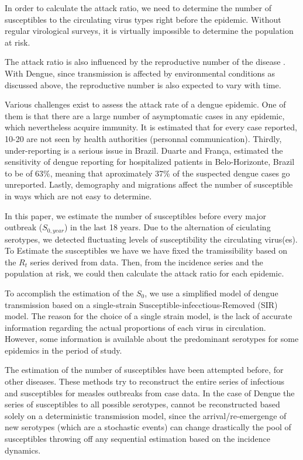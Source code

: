 In order to calculate the attack ratio, we need to determine the number of 
susceptibles to the circulating virus types right before the epidemic. Without 
regular virological surveys, it is virtually impossible to determine the 
population at risk.

The attack ratio is also influenced by the reproductive number of the disease 
\cite{bacaer_final_2009, katriel_attack_2012}. With Dengue, since transmission 
is affected by environmental conditions as discussed above, the reproductive 
number is also expected to vary with time.

Various challenges exist to assess the attack rate of a dengue epidemic. One of 
them is that there are a large number of asymptomatic cases in any epidemic, 
which nevertheless acquire immunity. It is estimated that for 
every case reported, 10-20 are not seen by health authorities (personnal 
communication).
Thirdly, under-reporting is a serious issue in Brazil. 
Duarte and Fran\c{c}a\cite{duarte_data_2006}, estimated 
the sensitivity of dengue reporting for hospitalized patients in 
Belo-Horizonte, Brazil to be of 63\%, 
meaning that aproximately 37\% of the suspected dengue cases go unreported.  
Lastly, demography and migrations affect the number of susceptible in ways which 
are not easy to determine.


In this paper, we estimate the number of susceptibles before every major 
outbreak ($S_{0, year}$) in the last 18 years. Due to the alternation of 
ciculating serotypes, we detected fluctuating levels of susceptibility the 
circulating virus(es). To Estimate the susceptibles we have we have fixed the 
tramissibility based on the $R_t$ series derived from data\cite{nishiura}. Then, 
from the incidence series and the population at risk, we could then calculate 
the attack ratio for each epidemic.

To accomplish the estimation of the $S_0$, we use a simplified model of 
dengue transmission based on a single-strain Susceptible-infecctious-Removed 
(SIR) model. The reason for the choice of a single strain model, is the lack of 
accurate information regarding the actual proportions of each virus in 
circulation. However, some information is available about the predominant 
serotypes for some epidemics in the period 
of study\cite{macedo_virological_2013}. 

The estimation of the  number of susceptibles have been attempted 
before, for other diseases\cite{bjornstad_dynamics_2002, 
wallinga_reconstruction_2003}. These methods try to reconstruct the entire 
series of infectious and susceptibles for measles 
outbreaks from case data. In the case of Dengue the 
series of susceptibles to all possible serotypes, cannot be reconstructed based 
solely on a deterministic transmission model, since the arrival/re-emergenge of 
new serotypes (which are a stochastic events) can change drastically the pool 
of susceptibles throwing off any sequential estimation based on the incidence
dynamics.

